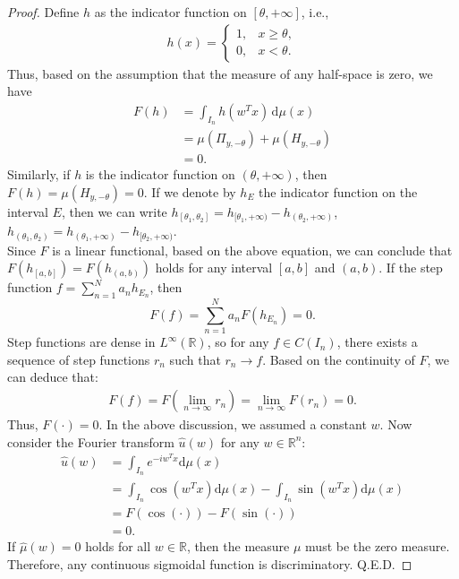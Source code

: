 \documentclass[12pt]{article}
\begin{document}
\begin{proof}
Define $h$ as the indicator function on $[\theta, +\infty]$, i.e.,
\begin{align*}
    h(x) = \begin{cases}
        1, & x \geq \theta, \\
        0, & x < \theta.
    \end{cases}
\end{align*}
Thus, based on the assumption that the measure of any half-space is zero, we have
\begin{align*}
    F(h) &= \int_{I_n} h(w^T x) \, \mathrm{d}\mu(x) \\
    &= \mu(\Pi_{y, -\theta}) + \mu(H_{y, -\theta}) \\
    &= 0.
\end{align*}
Similarly, if $h$ is the indicator function on $(\theta, +\infty)$, then $F(h) = \mu(H_{y, -\theta}) = 0$. If we denote by $h_E$ the indicator function on the interval $E$, then we can write
$
    h_{[\theta_1,\theta_2]}=h_{[\theta_1,+\infty)}-h_{(\theta_2,+\infty)}$,
    $h_{(\theta_1,\theta_2)}=h_{(\theta_1,+\infty)}-h_{[\theta_2,+\infty)}
$.
\\

Since $F$ is a linear functional, based on the above equation, we can conclude that $F(h_{[a,b]}) = F(h_{(a,b)})$ holds for any interval $[a,b]$ and $(a,b)$. If the step function $f = \sum_{n=1}^N a_n h_{E_n}$, then
$$
F(f) = \sum_{n=1}^N a_n F(h_{E_n}) = 0.
$$
Step functions are dense in $L^{\infty}(\mathbb{R})$, so for any $f \in C(I_n)$, there exists a sequence of step functions $r_n$ such that $r_n \to f$. Based on the continuity of $F$, we can deduce that:
\begin{align*}
    F(f)=F(\lim_{n\to\infty}r_n)=\lim_{n\to\infty} F(r_n)=0.
\end{align*}
Thus, $F(\cdot) = 0$. In the above discussion, we assumed a constant $w$. Now consider the Fourier transform $\hat{u}(w)$ for any $w \in \mathbb{R}^n$:
\begin{align*}
    \hat{u}(w)&=\int_{I_n} e^{-iw^Tx}\mathrm{d}\mu(x)\\
    &=\int_{I_n} \cos(w^Tx)\mathrm{d}\mu(x)-\int_{I_n} \sin(w^Tx)\mathrm{d}\mu(x)\\
    &=F(\cos(\cdot))-F(\sin(\cdot))\\
    &=0.
\end{align*}
If $\hat{\mu}(w) = 0$ holds for all $w \in \mathbb{R}$, then the measure $\mu$ must be the zero measure. Therefore, any continuous sigmoidal function is discriminatory. Q.E.D.

\end{proof}
\end{document}
